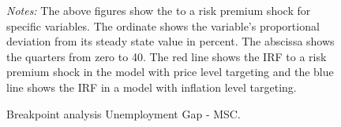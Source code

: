 \documentclass[11pt, a4paper, leqno]{article}
\begin{document}
\begin{figure}[ht!]
	\caption{Breakpoint analysis Unemployment Gap - MSC.}
	\centering
    	\bigskip
	\begin{minipage}{\textwidth}%
		\footnotesize\setlength{\baselineskip}{11pt}%
		\bigskip \textit{Notes:} The above figures show the  to a risk premium shock for specific variables. The ordinate shows the variable's proportional deviation from its steady state value in percent. The abscissa shows the quarters from zero to 40. The red line shows the IRF to a risk premium shock in the model with price level targeting and the blue line shows the IRF in a model with inflation level targeting.
	\end{minipage}
\end{figure}
\end{document}
